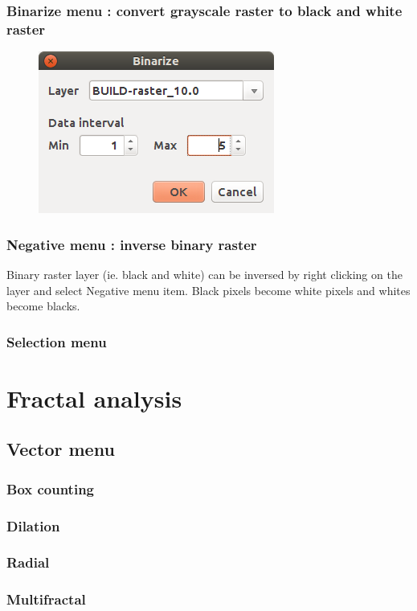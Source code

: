 \documentclass[a4paper,10pt]{report}
\begin{document}
\subsection{Binarize menu : convert grayscale raster to black and white raster}
\begin{figure}[H]
	\includegraphics[scale=0.5]{img/binarize-en.png}
\end{figure}

\subsection{Negative menu : inverse binary raster}
Binary raster layer (ie. black and white) can be inversed by right clicking on the layer and select Negative menu item. Black pixels become white pixels and whites become blacks.

\subsection{Selection menu}

\chapter{Fractal analysis}
\section{Vector menu}
\subsection{Box counting}
\subsection{Dilation}
\subsection{Radial}
\subsection{Multifractal}
\end{document}
